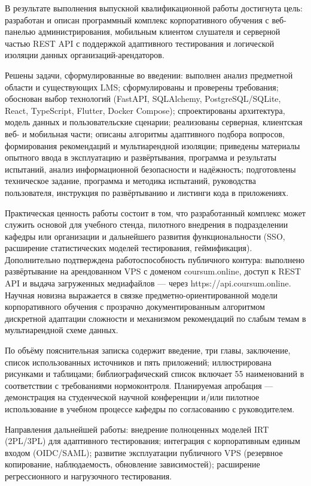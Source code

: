 \Conclusion

В результате выполнения выпускной квалификационной работы достигнута цель: разработан и описан программный комплекс корпоративного обучения с веб-панелью администрирования, мобильным клиентом слушателя и серверной частью REST API с поддержкой адаптивного тестирования и логической изоляции данных организаций-арендаторов.

Решены задачи, сформулированные во введении: выполнен анализ предметной области и существующих LMS; сформулированы и проверены требования; обоснован выбор технологий (FastAPI, SQLAlchemy, PostgreSQL/SQLite, React, TypeScript, Flutter, Docker Compose); спроектированы архитектура, модель данных и пользовательские сценарии; реализованы серверная, клиентская веб- и мобильная части; описаны алгоритмы адаптивного подбора вопросов, формирования рекомендаций и мультиарендной изоляции; приведены материалы опытного ввода в эксплуатацию и развёртывания, программа и результаты испытаний, анализ информационной безопасности и надёжность; подготовлены техническое задание, программа и методика испытаний, руководства пользователя, инструкция по развёртыванию и листинги кода в приложениях.

Практическая ценность работы состоит в том, что разработанный комплекс может служить основой для учебного стенда, пилотного внедрения в подразделении кафедры или организации и дальнейшего развития функциональности (SSO, расширение статистических моделей тестирования, геймификация). Дополнительно подтверждена работоспособность публичного контура: выполнено развёртывание на арендованном VPS с доменом coursum.online, доступ к REST API и выдача загруженных медиафайлов --- через https://api.coursum.online. Научная новизна выражается в связке предметно-ориентированной модели корпоративного обучения с прозрачно документированным алгоритмом дискретной адаптации сложности и механизмом рекомендаций по слабым темам в мультиарендной схеме данных.

По объёму пояснительная записка содержит введение, три главы, заключение, список использованных источников и пять приложений; иллюстрирована рисунками и таблицами; библиографический список включает 55 наименований в соответствии с требованиями нормоконтроля. Планируемая апробация --- демонстрация на студенческой научной конференции и/или пилотное использование в учебном процессе кафедры по согласованию с руководителем.

Направления дальнейшей работы: внедрение полноценных моделей IRT (2PL/3PL) для адаптивного тестирования; интеграция с корпоративным единым входом (OIDC/SAML); развитие эксплуатации публичного VPS (резервное копирование, наблюдаемость, обновление зависимостей); расширение регрессионного и нагрузочного тестирования\cite{metodichka_vkr_ikt_2021,gost7322017,sutherland2016scrum}.
